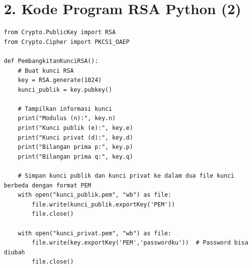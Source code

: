 \documentclass{article}
\begin{document}

\section*{2. Kode Program RSA Python (2)}

\begin{verbatim}
from Crypto.PublicKey import RSA
from Crypto.Cipher import PKCS1_OAEP

def PembangkitanKunciRSA():
    # Buat kunci RSA
    key = RSA.generate(1024)
    kunci_publik = key.pubkey()

    # Tampilkan informasi kunci
    print("Modulus (n):", key.n)
    print("Kunci publik (e):", key.e)
    print("Kunci privat (d):", key.d)
    print("Bilangan prima p:", key.p)
    print("Bilangan prima q:", key.q)

    # Simpan kunci publik dan kunci privat ke dalam dua file kunci berbeda dengan format PEM
    with open("kunci_publik.pem", "wb") as file:
        file.write(kunci_publik.exportKey('PEM'))
        file.close()

    with open("kunci_privat.pem", "wb") as file:
        file.write(key.exportKey('PEM','passwordku'))  # Password bisa diubah
        file.close()
\end{verbatim}
\end{document}
